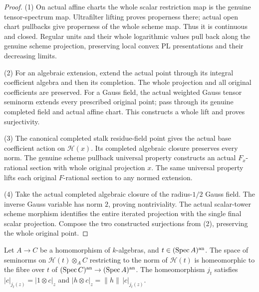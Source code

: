 \begin{proof}
(1) On actual affine charts the whole scalar restriction map is the genuine
tensor-spectrum map. Ultrafilter lifting proves properness there; actual open
chart pullbacks give properness of the whole scheme map. Thus it is continuous
and closed. Regular units and their whole logarithmic values pull back along
the genuine scheme projection, preserving local convex PL presentations and
their decreasing limits.

(2) For an algebraic extension, extend the actual point through its integral
coefficient algebra and then its completion. The whole projection and all
original coefficients are preserved. For a Gauss field, the actual weighted
Gauss tensor seminorm extends every prescribed original point; pass through
its genuine completed field and actual affine chart. This constructs a whole
lift and proves surjectivity.

(3) The canonical completed stalk residue-field point gives the actual base
coefficient action on $\mathcal H(x)$. Its completed algebraic closure preserves
every norm. The genuine scheme pullback universal property constructs an actual
$F_x$-rational section with whole original projection $x$. The same universal
property lifts each original $F$-rational section to any normed extension.

(4) Take the actual completed algebraic closure of the radius-$1/2$ Gauss field.
The inverse Gauss variable has norm $2$, proving nontriviality. The actual
scalar-tower scheme morphism identifies the entire iterated projection with
the single final scalar projection. Compose the two constructed surjections
from (2), preserving the whole original point.
\end{proof}

\begin{lemma}\label{lem:fc-affine-fibre-model}
\leanok
{}
Let $A\to C$ be a homomorphism of $k$-algebras, and $t\in(\operatorname{Spec} A)^{\mathrm{an}}$.
The space of seminorms on $\mathcal H(t)\otimes_AC$ restricting to the norm of $\mathcal H(t)$ is homeomorphic to
the fibre over $t$ of $(\operatorname{Spec} C)^{\mathrm{an}}\to(\operatorname{Spec} A)^{\mathrm{an}}$. The homeomorphism $j_t$ satisfies
$|c|_{j_t(z)}=|1\otimes c|_z$ and $|h\otimes c|_z=\lVert h\rVert\,|c|_{j_t(z)}$.
\end{lemma}

